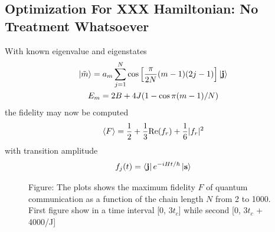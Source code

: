 \documentclass[../../../main.tex]{subfiles}
\begin{document}
\subsection{Optimization For XXX Hamiltonian: No Treatment Whatsoever}
With known eigenvalue and eigenstates
\begin{gather*}
    \ket{\tilde{m }} = a_m \sum_{j=1} ^{N} \cos \left[ \frac{\pi }{2N }(m-1 ) (2j-1)\right]  \ket{\mathbf{j}}\\
    E_m = 2B + 4 J (1 - \cos \pi(m-1)/N)
\end{gather*}
the fidelity may now be computed
\begin{equation*}
    \braket{F }  = \frac{1 }{2 } + \frac{1 }{3} \mathrm{Re} (f_r) +\frac{1 }{6 }|f_r|^2
\end{equation*}
with transition amplitude
\begin{equation*}
    f_j(t) = \bra{\mathbf{j}} e ^{-iHt/\hbar }\ket{\mathbf{s}}
\end{equation*}

\begin{figure}
    \centering
    \resizebox{\textwidth}{!}{}
    \resizebox{\textwidth}{!}{}
    \caption*{Figure: The plots shows the maximum fidelity $F$ of quantum communication as a function of the chain length $N$ from 2 to 1000. First figure show  in a time interval [0, $3t_c$] while second [0, $3t_c$ + 4000/J]}
\end{figure}
\end{document}
